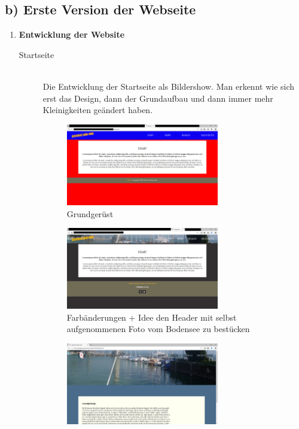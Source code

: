 \documentclass{scrartcl}
\begin{document}
\subsection*{b) Erste Version der Webseite}
\begin{enumerate}
\item \textbf{Entwicklung der Website}\\
\begin{description}
\item[Startseite] \ \\
Die Entwicklung der Startseite als Bildershow. Man erkennt wie sich erst das Design, dann der Grundaufbau und dann immer mehr Kleinigkeiten geändert haben.
\begin{figure}[H]
 \centering
   \includegraphics[width=0.7\textwidth]{alt1.png}
\caption{Grundgerüst}
\end{figure}
\begin{figure}[H]
 \centering
   \includegraphics[width=0.7\textwidth]{alt2.png}
\caption{Farbänderungen + Idee den Header mit selbst aufgenommenen Foto vom Bodensee zu bestücken}
\end{figure}
\begin{figure}[H]
 \centering
   \includegraphics[width=0.7\textwidth]{index.png}

\end{figure}
\end{description}
\end{enumerate}
\end{document}
